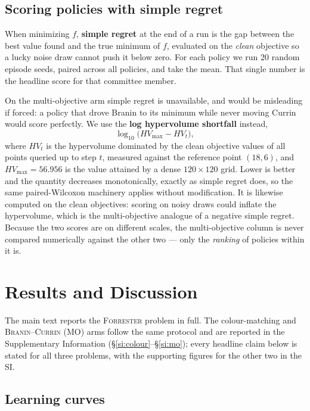 \documentclass[11pt]{article}
\begin{document}
\subsection{Scoring policies with simple regret}

When minimizing $f$, \textbf{simple regret} at the end of a run is the gap between the best value found and the true minimum of $f$, evaluated on the \emph{clean} objective so a lucky noise draw cannot push it below zero. For each policy we run 20 random episode seeds, paired across all policies, and take the mean. That single number is the headline score for that committee member.

On the multi-objective arm simple regret is unavailable, and would be misleading if forced: a policy that drove Branin to its minimum while never moving Currin would score perfectly. We use the \textbf{log hypervolume shortfall} instead,
\[
  \log_{10}\bigl(HV_{\max} - HV_t\bigr),
\]
where $HV_t$ is the hypervolume dominated by the clean objective values of all points queried up to step $t$, measured against the reference point $(18, 6)$, and $HV_{\max} = 56.956$ is the value attained by a dense $120\times120$ grid. Lower is better and the quantity decreases monotonically, exactly as simple regret does, so the same paired-Wilcoxon machinery applies without modification. It is likewise computed on the clean objectives: scoring on noisy draws could inflate the hypervolume, which is the multi-objective analogue of a negative simple regret. Because the two scores are on different scales, the multi-objective column is never compared numerically against the other two --- only the \emph{ranking} of policies within it is.

\section{Results and Discussion}

The main text reports the \textsc{Forrester} problem in full. The colour-matching and \textsc{Branin--Currin (MO)} arms follow the same protocol and are reported in the Supplementary Information (\S\ref{si:colour}--\S\ref{si:mo}); every headline claim below is stated for all three problems, with the supporting figures for the other two in the SI.

\subsection{Learning curves}
\end{document}
